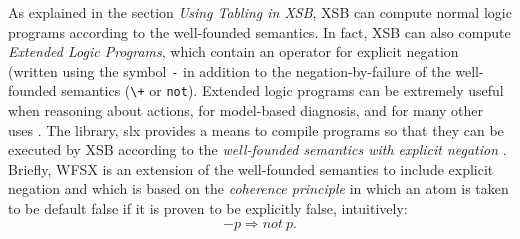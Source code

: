 As explained in the section {\it Using Tabling in XSB}, XSB can
compute normal logic programs according to the well-founded semantics.
In fact, XSB can also compute {\em Extended Logic Programs}, which
contain an operator for explicit negation (written using the symbol
{\tt -} in addition to the negation-by-failure of the well-founded
semantics (\verb|\+| or {\tt not}).  Extended logic programs can be
extremely useful when reasoning about actions, for model-based
diagnosis, and for many other uses \cite{AlPe95}.  The library, {\sf
slx} provides a means to compile programs so that they can be executed
by XSB according to the {\em well-founded semantics with explicit
negation} \cite{ADP95}.  Briefly, WFSX is an extension of the
well-founded semantics to include explicit negation and which is based
on the {\em coherence principle} in which an atom is taken to be
default false if it is proven to be explicitly false, intuitively:
\[
-p \Rightarrow not\ p.
\]


